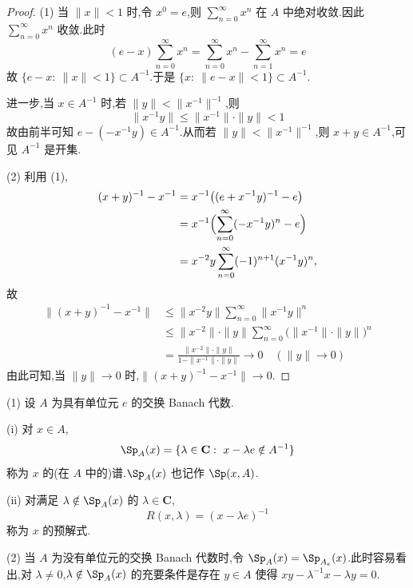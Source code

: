 \begin{proof}
(1) 当 $\|x\| < 1$ 时,令 $x^{0} = e$,则 $\sum_{n=0}^{\infty} x^{n}$ 在 $A$ 中绝对收敛.因此 $\sum_{n=0}^{\infty} x^{n}$ 收敛.此时
\begin{equation*}
(e - x)\sum_{n=0}^{\infty} x^{n} = \sum_{n=0}^{\infty} x^{n} - \sum_{n=1}^{\infty} x^{n} = e
\end{equation*}
故 $\{e - x:\ \|x\| < 1\} \subset A^{-1}$.于是 $\{x:\ \|e - x\| < 1\} \subset A^{-1}$.

进一步,当 $x \in A^{-1}$ 时,若 $\|y\| < \|x^{-1}\|^{-1}$,则
\begin{equation*}
\|x^{-1} y\| \leq \|x^{-1}\| \cdot \|y\| < 1
\end{equation*}
故由前半可知 $e - (-x^{-1}y) \in A^{-1}$.从而若 $\|y\| < \|x^{-1}\|^{-1}$,则 $x + y \in A^{-1}$,可见 $A^{-1}$ 是开集.

(2) 利用 (1),
\begin{align*}
(x + y)^{-1} - x^{-1} & = x^{-1}\bigl((e + x^{-1}y)^{-1} - e\bigr) \\
& = x^{-1}\Bigl(\sum_{n=0}^{\infty} (-x^{-1}y)^{n} - e\Bigr) \\
& = x^{-2}y\sum_{n=0}^{\infty} (-1)^{n+1}(x^{-1}y)^{n},
\end{align*}
故
\begin{align*}
\|(x + y)^{-1} - x^{-1}\| & \leq \|x^{-2}y\|\sum_{n=0}^{\infty}\|x^{-1}y\|^{n} \\
& \leq \|x^{-2}\| \cdot \|y\|\sum_{n=0}^{\infty}\bigl(\|x^{-1}\| \cdot \|y\|\bigr)^{n} \\
& = \frac{\|x^{-2}\| \cdot \|y\|}{1 - \|x^{-1}\| \cdot \|y\|} \to 0 \quad (\|y\| \to 0)
\end{align*}
由此可知,当 $\|y\| \to 0$ 时,$\|(x + y)^{-1} - x^{-1}\| \to 0$.
\end{proof}

\begin{definition}\label{def:3.1.4}

(1) 设 $A$ 为具有单位元 $e$ 的交换 Banach 代数.

(i) 对 $x \in A$,
\begin{equation*}
\Sp_{A}(x) = \{\lambda \in \mathbf{C}:\ x - \lambda e \notin A^{-1}\}
\end{equation*}
称为 $x$ 的(在 $A$ 中的)谱.$\Sp_{A}(x)$ 也记作 $\Sp(x, A)$.

(ii) 对满足 $\lambda \notin \Sp_{A}(x)$ 的 $\lambda \in \mathbf{C}$,
\begin{equation*}
R(x, \lambda) = (x - \lambda e)^{-1}
\end{equation*}
称为 $x$ 的预解式.

(2) 当 $A$ 为没有单位元的交换 Banach 代数时,令 $\Sp_{A}(x) = \Sp_{A_{e}}(x)$.此时容易看出,对 $\lambda \neq 0$,$\lambda \notin \Sp_{A}(x)$ 的充要条件是存在 $y \in A$ 使得 $xy - \lambda^{-1}x - \lambda y = 0$.
\end{definition}

